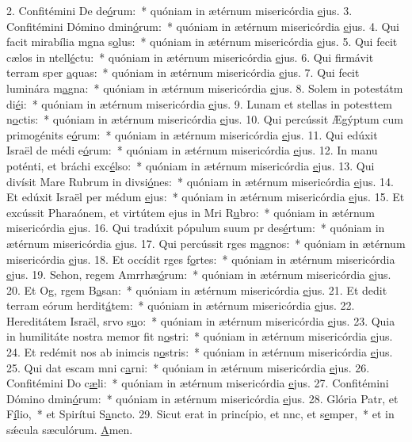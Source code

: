 2. Confitémini De de\uline{ó}rum:~* quóniam in ætérnum misericórdia \uline{e}jus.
3. Confitémini Dómino dmin\uline{ó}rum:~* quóniam in ætérnum misericórdia \uline{e}jus.
4. Qui facit mirabília mgna s\uline{o}lus:~* quóniam in ætérnum misericórdia \uline{e}jus.
5. Qui fecit cælos in ntell\uline{é}ctu:~* quóniam in ætérnum misericórdia \uline{e}jus.
6. Qui firmávit terram sper \uline{a}quas:~* quóniam in ætérnum misericórdia \uline{e}jus.
7. Qui fecit luminára m\uline{a}gna:~* quóniam in ætérnum misericórdia \uline{e}jus.
8. Solem in potestátm di\uline{é}i:~* quóniam in ætérnum misericórdia \uline{e}jus.
9. Lunam et stellas in potesttem n\uline{o}ctis:~* quóniam in ætérnum misericórdia \uline{e}jus.
10. Qui percússit Ægýptum cum primogénits e\uline{ó}rum:~* quóniam in ætérnum misericórdia \uline{e}jus.
11. Qui edúxit Israël de médi e\uline{ó}rum:~* quóniam in ætérnum misericórdia \uline{e}jus.
12. In manu poténti, et bráchi exc\uline{é}lso:~* quóniam in ætérnum misericórdia \uline{e}jus.
13. Qui divísit Mare Rubrum in divsi\uline{ó}nes:~* quóniam in ætérnum misericórdia \uline{e}jus.
14. Et edúxit Israël per médum \uline{e}jus:~* quóniam in ætérnum misericórdia \uline{e}jus.
15. Et excússit Pharaónem, et virtútem ejus in Mri R\uline{u}bro:~* quóniam in ætérnum misericórdia \uline{e}jus.
16. Qui tradúxit pópulum suum pr des\uline{é}rtum:~* quóniam in ætérnum misericórdia \uline{e}jus.
17. Qui percússit rges m\uline{a}gnos:~* quóniam in ætérnum misericórdia \uline{e}jus.
18. Et occídit rges f\uline{o}rtes:~* quóniam in ætérnum misericórdia \uline{e}jus.
19. Sehon, regem Amrrhæ\uline{ó}rum:~* quóniam in ætérnum misericórdia \uline{e}jus.
20. Et Og, rgem B\uline{a}san:~* quóniam in ætérnum misericórdia \uline{e}jus.
21. Et dedit terram eórum herdit\uline{á}tem:~* quóniam in ætérnum misericórdia \uline{e}jus.
22. Hereditátem Israël, srvo s\uline{u}o:~* quóniam in ætérnum misericórdia \uline{e}jus.
23. Quia in humilitáte nostra memor fit n\uline{o}stri:~* quóniam in ætérnum misericórdia \uline{e}jus.
24. Et redémit nos ab inimcis n\uline{o}stris:~* quóniam in ætérnum misericórdia \uline{e}jus.
25. Qui dat escam mni c\uline{a}rni:~* quóniam in ætérnum misericórdia \uline{e}jus.
26. Confitémini Do c\uline{æ}li:~* quóniam in ætérnum misericórdia \uline{e}jus.
27. Confitémini Dómino dmin\uline{ó}rum:~* quóniam in ætérnum misericórdia \uline{e}jus.
28. Glória Patr, et F\uline{í}lio,~* et Spirítui S\uline{a}ncto.
29. Sicut erat in princípio, et nnc, et s\uline{e}mper,~* et in sǽcula sæculórum. \uline{A}men.
